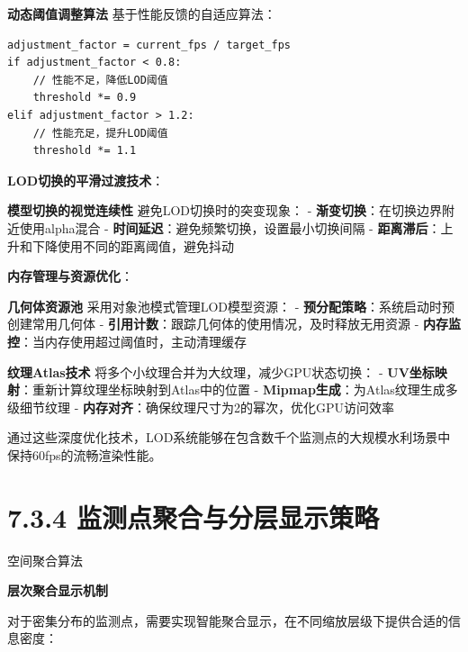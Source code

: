 \textbf{动态阈值调整算法} 基于性能反馈的自适应算法：

\begin{lstlisting}
adjustment_factor = current_fps / target_fps
if adjustment_factor < 0.8:
    // 性能不足，降低LOD阈值
    threshold *= 0.9
elif adjustment_factor > 1.2:
    // 性能充足，提升LOD阈值  
    threshold *= 1.1
\end{lstlisting}

\textbf{LOD切换的平滑过渡技术}：

\textbf{模型切换的视觉连续性} 避免LOD切换时的突变现象： - \textbf{渐变切换}：在切换边界附近使用alpha混合 - \textbf{时间延迟}：避免频繁切换，设置最小切换间隔 - \textbf{距离滞后}：上升和下降使用不同的距离阈值，避免抖动

\textbf{内存管理与资源优化}：

\textbf{几何体资源池} 采用对象池模式管理LOD模型资源： - \textbf{预分配策略}：系统启动时预创建常用几何体 - \textbf{引用计数}：跟踪几何体的使用情况，及时释放无用资源 - \textbf{内存监控}：当内存使用超过阈值时，主动清理缓存

\textbf{纹理Atlas技术} 将多个小纹理合并为大纹理，减少GPU状态切换： - \textbf{UV坐标映射}：重新计算纹理坐标映射到Atlas中的位置 - \textbf{Mipmap生成}：为Atlas纹理生成多级细节纹理 - \textbf{内存对齐}：确保纹理尺寸为2的幂次，优化GPU访问效率

通过这些深度优化技术，LOD系统能够在包含数千个监测点的大规模水利场景中保持60fps的流畅渲染性能。

\section{7.3.4 监测点聚合与分层显示策略}

 空间聚合算法

\textbf{层次聚合显示机制}

对于密集分布的监测点，需要实现智能聚合显示，在不同缩放层级下提供合适的信息密度：

